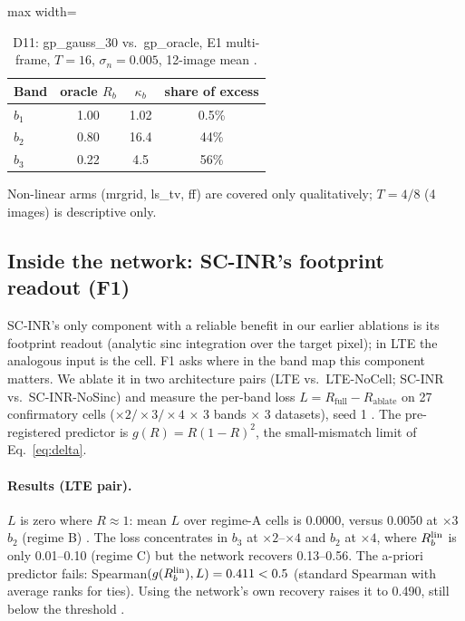 \begin{table}[t]\centering\small
\caption{D11: gp\_gauss\_30 vs.\ gp\_oracle, E1 multi-frame, $T=16$,
$\sigma_n=0.005$, 12-image mean .}\label{tab:d11}
\begin{adjustbox}{max width=\linewidth}\begin{tabular}{lccc}\toprule
Band & oracle $R_b$ & $\kappa_b$ & share of excess\\\midrule
$b_1$ & 1.00 & 1.02 & 0.5\%\\
$b_2$ & 0.80 & 16.4 & 44\%\\
$b_3$ & 0.22 & 4.5 & 56\%\\
\bottomrule\end{tabular}\end{adjustbox}
\end{table}

\noindent Non-linear arms (mrgrid, ls\_tv, ff) are covered only
qualitatively; $T=4/8$ (4 images) is descriptive only.


\subsection{Inside the network: SC-INR's footprint readout (F1)}\label{sec:exp-f1}

SC-INR's only component with a reliable benefit in our earlier ablations is
its footprint readout (analytic sinc integration over the target pixel); in
LTE the analogous input is the cell. F1 asks where in the band map this
component matters. We ablate it in two architecture pairs (LTE vs.\
LTE-NoCell; SC-INR vs.\ SC-INR-NoSinc) and measure the per-band loss
$L=R_{\mathrm{full}}-R_{\mathrm{ablate}}$ on 27 confirmatory cells
($\times2/\times3/\times4$ $\times$ 3 bands $\times$ 3 datasets), seed 1
\src{F1}. The pre-registered predictor is $g(R)=R(1-R)^2$, the
small-mismatch limit of Eq.~\eqref{eq:delta}.

\paragraph{Results (LTE pair).} $L$ is zero where $R\approx1$: mean $L$ over
regime-A cells is 0.0000, versus 0.0050 at $\times3$ $b_2$ (regime B)
\src{F1; E4-T1}. The loss concentrates in $b_3$ at $\times2$--$\times4$
and $b_2$ at $\times4$, where $R_b^{\mathrm{lin}}$ is only 0.01--0.10 (regime C) but the
network recovers 0.13--0.56. The a-priori predictor fails:
Spearman$(g(R_b^{\mathrm{lin}}),L)=0.411<0.5$ (standard Spearman with average ranks for
ties). Using the network's own recovery raises it to 0.490, still below the
threshold \src{E4-T1}.

